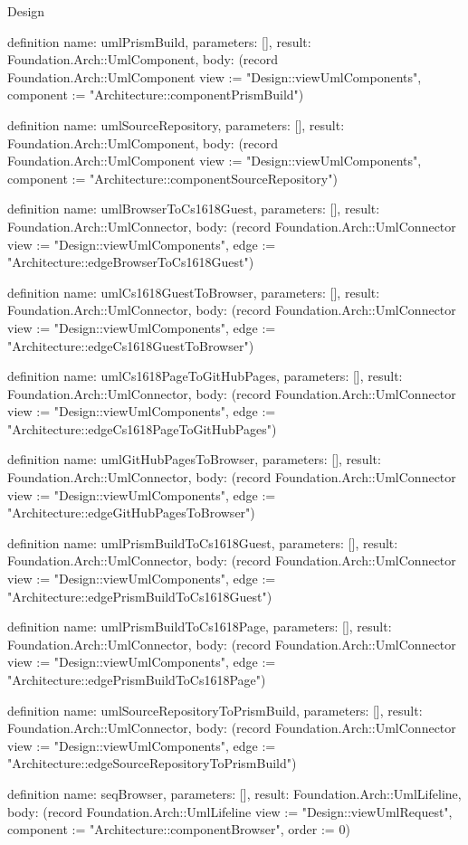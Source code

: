 \begin{lexlean}{Design}
\begin{semanticmodule}
definition{
  name: umlPrismBuild,
  parameters: [],
  result: Foundation.Arch::UmlComponent,
  body: (record Foundation.Arch::UmlComponent {view := "Design::viewUmlComponents", component := "Architecture::componentPrismBuild"})
}

definition{
  name: umlSourceRepository,
  parameters: [],
  result: Foundation.Arch::UmlComponent,
  body: (record Foundation.Arch::UmlComponent {view := "Design::viewUmlComponents", component := "Architecture::componentSourceRepository"})
}

definition{
  name: umlBrowserToCs1618Guest,
  parameters: [],
  result: Foundation.Arch::UmlConnector,
  body: (record Foundation.Arch::UmlConnector {view := "Design::viewUmlComponents", edge := "Architecture::edgeBrowserToCs1618Guest"})
}

definition{
  name: umlCs1618GuestToBrowser,
  parameters: [],
  result: Foundation.Arch::UmlConnector,
  body: (record Foundation.Arch::UmlConnector {view := "Design::viewUmlComponents", edge := "Architecture::edgeCs1618GuestToBrowser"})
}

definition{
  name: umlCs1618PageToGitHubPages,
  parameters: [],
  result: Foundation.Arch::UmlConnector,
  body: (record Foundation.Arch::UmlConnector {view := "Design::viewUmlComponents", edge := "Architecture::edgeCs1618PageToGitHubPages"})
}

definition{
  name: umlGitHubPagesToBrowser,
  parameters: [],
  result: Foundation.Arch::UmlConnector,
  body: (record Foundation.Arch::UmlConnector {view := "Design::viewUmlComponents", edge := "Architecture::edgeGitHubPagesToBrowser"})
}

definition{
  name: umlPrismBuildToCs1618Guest,
  parameters: [],
  result: Foundation.Arch::UmlConnector,
  body: (record Foundation.Arch::UmlConnector {view := "Design::viewUmlComponents", edge := "Architecture::edgePrismBuildToCs1618Guest"})
}

definition{
  name: umlPrismBuildToCs1618Page,
  parameters: [],
  result: Foundation.Arch::UmlConnector,
  body: (record Foundation.Arch::UmlConnector {view := "Design::viewUmlComponents", edge := "Architecture::edgePrismBuildToCs1618Page"})
}

definition{
  name: umlSourceRepositoryToPrismBuild,
  parameters: [],
  result: Foundation.Arch::UmlConnector,
  body: (record Foundation.Arch::UmlConnector {view := "Design::viewUmlComponents", edge := "Architecture::edgeSourceRepositoryToPrismBuild"})
}

definition{
  name: seqBrowser,
  parameters: [],
  result: Foundation.Arch::UmlLifeline,
  body: (record Foundation.Arch::UmlLifeline {view := "Design::viewUmlRequest", component := "Architecture::componentBrowser", order := 0})
}


\end{semanticmodule}
\end{lexlean}
